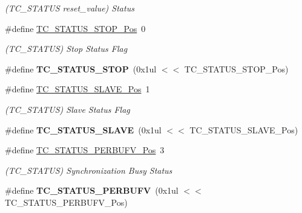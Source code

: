 \begin{DoxyCompactItemize}
\begin{DoxyCompactList}\small\item\em (T\+C\+\_\+\+S\+T\+A\+T\+U\+S reset\+\_\+value) Status \end{DoxyCompactList}\item 
\hypertarget{group___s_a_m_l21___t_c_ga100f3c31d8974736df3227ac59df5190}{}\#define \hyperlink{group___s_a_m_l21___t_c_ga100f3c31d8974736df3227ac59df5190}{T\+C\+\_\+\+S\+T\+A\+T\+U\+S\+\_\+\+S\+T\+O\+P\+\_\+\+Pos}~0\label{group___s_a_m_l21___t_c_ga100f3c31d8974736df3227ac59df5190}

\begin{DoxyCompactList}\small\item\em (T\+C\+\_\+\+S\+T\+A\+T\+U\+S) Stop Status Flag \end{DoxyCompactList}\item 
\hypertarget{group___s_a_m_l21___t_c_ga6b580c822a95d531a86d7acce6cb30e7}{}\#define {\bfseries T\+C\+\_\+\+S\+T\+A\+T\+U\+S\+\_\+\+S\+T\+O\+P}~(0x1ul $<$$<$ T\+C\+\_\+\+S\+T\+A\+T\+U\+S\+\_\+\+S\+T\+O\+P\+\_\+\+Pos)\label{group___s_a_m_l21___t_c_ga6b580c822a95d531a86d7acce6cb30e7}

\item 
\hypertarget{group___s_a_m_l21___t_c_ga5caa18b1cc9cd3285aa2b76b47a7de6c}{}\#define \hyperlink{group___s_a_m_l21___t_c_ga5caa18b1cc9cd3285aa2b76b47a7de6c}{T\+C\+\_\+\+S\+T\+A\+T\+U\+S\+\_\+\+S\+L\+A\+V\+E\+\_\+\+Pos}~1\label{group___s_a_m_l21___t_c_ga5caa18b1cc9cd3285aa2b76b47a7de6c}

\begin{DoxyCompactList}\small\item\em (T\+C\+\_\+\+S\+T\+A\+T\+U\+S) Slave Status Flag \end{DoxyCompactList}\item 
\hypertarget{group___s_a_m_l21___t_c_ga283ce3f926ce4b989ea0d36416309912}{}\#define {\bfseries T\+C\+\_\+\+S\+T\+A\+T\+U\+S\+\_\+\+S\+L\+A\+V\+E}~(0x1ul $<$$<$ T\+C\+\_\+\+S\+T\+A\+T\+U\+S\+\_\+\+S\+L\+A\+V\+E\+\_\+\+Pos)\label{group___s_a_m_l21___t_c_ga283ce3f926ce4b989ea0d36416309912}

\item 
\hypertarget{group___s_a_m_l21___t_c_ga19e173eff0cb0993407bfb0ff4c49ae1}{}\#define \hyperlink{group___s_a_m_l21___t_c_ga19e173eff0cb0993407bfb0ff4c49ae1}{T\+C\+\_\+\+S\+T\+A\+T\+U\+S\+\_\+\+P\+E\+R\+B\+U\+F\+V\+\_\+\+Pos}~3\label{group___s_a_m_l21___t_c_ga19e173eff0cb0993407bfb0ff4c49ae1}

\begin{DoxyCompactList}\small\item\em (T\+C\+\_\+\+S\+T\+A\+T\+U\+S) Synchronization Busy Status \end{DoxyCompactList}\item 
\hypertarget{group___s_a_m_l21___t_c_ga609d5ee9a0cec7af486599d74c283b57}{}\#define {\bfseries T\+C\+\_\+\+S\+T\+A\+T\+U\+S\+\_\+\+P\+E\+R\+B\+U\+F\+V}~(0x1ul $<$$<$ T\+C\+\_\+\+S\+T\+A\+T\+U\+S\+\_\+\+P\+E\+R\+B\+U\+F\+V\+\_\+\+Pos)\label{group___s_a_m_l21___t_c_ga609d5ee9a0cec7af486599d74c283b57}


\end{DoxyCompactItemize}
